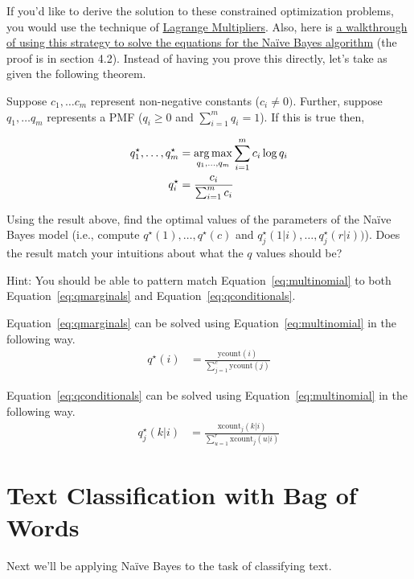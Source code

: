 \documentclass[assignment03_Solutions]{subfiles}
\begin{document}
\begin{exercise}[(60 minutes)]
If you'd like to derive the solution to these constrained optimization problems, you would use the technique of \href{http://tutorial.math.lamar.edu/Classes/CalcIII/LagrangeMultipliers.aspx}{Lagrange Multipliers}.  Also, here is \href{http://www.cs.columbia.edu/~mcollins/em.pdf}{a walkthrough of using this strategy to solve the equations for the Na\"ive Bayes algorithm} (the proof is in section 4.2).  Instead of having you prove this directly, let's take as given the following theorem.

Suppose $c_1, \ldots c_m$ represent non-negative constants ($c_i \neq 0)$.  Further, suppose $q_1, \ldots q_m$ represents a PMF ($q_i \geq 0$ and $\sum_{i=1}^m q_i = 1$).  If this is true then,

\begin{align}
q^\star_1, \ldots, q^\star_m &= \operatorname*{arg\,max}_{q_1, \ldots, q_m} \sum_{i=1}^m c_i \log q_i \nonumber \\
q^\star_i &= \frac{c_i}{\sum_{i=1}^m c_i} \label{eq:multinomial}
\end{align}

Using the result above, find the optimal values of the parameters of the Na\"ive Bayes model (i.e., compute $q^\star(1), \ldots, q^\star(c)$ and $q_j^\star(1|i), \ldots, q^\star_j(r|i))$).  Does the result match your intuitions about what the $q$ values should be?

Hint: You should be able to pattern match Equation~\ref{eq:multinomial} to both Equation~\ref{eq:qmarginals} and Equation~\ref{eq:qconditionals}. 

\begin{boxedsolution}
Equation~\ref{eq:qmarginals} can be solved using Equation~\ref{eq:multinomial} in the following way.
\begin{align}
q^\star(i) &= \frac{\mbox{ycount}(i)}{\sum_{j=1}^c \mbox{ycount}(j)}
\end{align}

Equation~\ref{eq:qconditionals} can be solved using Equation~\ref{eq:multinomial} in the following way.
\begin{align}
q_j^\star(k|i) &= \frac{\mbox{xcount}_j(k|i)}{\sum_{u=1}^r \mbox{xcount}_j(u|i)}
\end{align}
\end{boxedsolution}


\ees


\end{exercise}

\section{Text Classification with Bag of Words}
Next we'll be applying Na\"ive Bayes to the task of classifying text.
\end{document}
